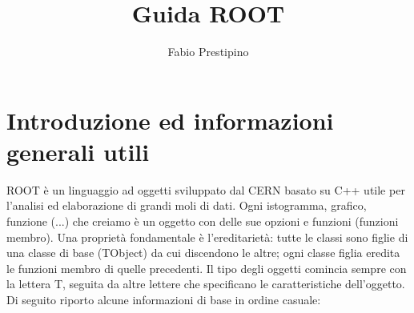 \documentclass[10pt,a4paper]{article}
\author{Fabio Prestipino}
\title{Guida ROOT}
\begin{document}
	
	\maketitle
	\tableofcontents
	\newpage
\section{Introduzione ed informazioni generali utili}
ROOT è un linguaggio ad oggetti sviluppato dal CERN basato su C++ utile per l'analisi ed elaborazione di grandi moli di dati. Ogni istogramma, grafico, funzione (...) che creiamo è un oggetto con delle sue opzioni e funzioni (funzioni membro). Una proprietà fondamentale è l'ereditarietà: tutte le classi sono figlie di una classe di base (TObject) da cui discendono le altre; ogni classe figlia eredita le funzioni membro di quelle precedenti. Il tipo degli oggetti comincia sempre con la lettera T, seguita da altre lettere che specificano le caratteristiche dell'oggetto. Di seguito riporto alcune informazioni di base in ordine casuale:
\end{document}
